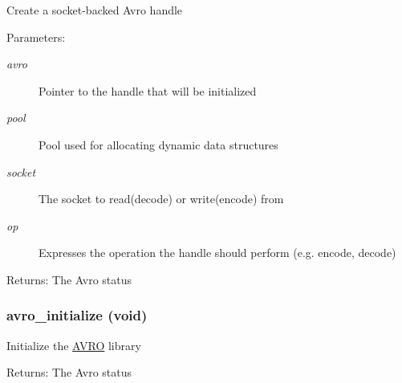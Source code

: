 Create a socket-backed Avro handle \begin{Desc}
\item[Parameters:]
\begin{description}
\item[{\em avro}]Pointer to the handle that will be initialized \item[{\em pool}]Pool used for allocating dynamic data structures \item[{\em socket}]The socket to read(decode) or write(encode) from \item[{\em op}]Expresses the operation the handle should perform (e.g. encode, decode) \end{description}
\end{Desc}
\begin{Desc}
\item[Returns:]The Avro status \end{Desc}
\hypertarget{group___handle___routines_gabfc5b0acfbb6439e7d3d7511035f11b}{
\subsubsection[{avro\_\-initialize}]{ avro\_\-initialize (void)}}
\label{group___handle___routines_gabfc5b0acfbb6439e7d3d7511035f11b}


Initialize the \hyperlink{struct_a_v_r_o}{AVRO} library \begin{Desc}
\item[Returns:]The Avro status \end{Desc}
